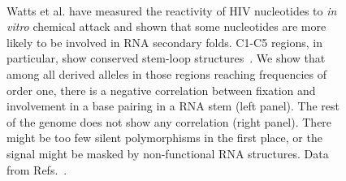 \documentclass[rmp, twocolumn]{revtex4}
\begin{document}
\begin{figure}
\begin{center}
\\
\caption{Watts et al. have measured the reactivity of HIV nucleotides to {\it
in vitro} chemical attack and shown that some nucleotides are more likely to
be involved in RNA secondary folds. C1-C5 regions, in particular, show
conserved stem-loop structures~\citep{watts_architecture_2009}. We show that
among all derived alleles in those regions reaching frequencies of order one,
there is a negative correlation between fixation and involvement in a base
pairing in a RNA stem (left panel). The rest of the genome does not show any
correlation (right panel). There might be too few silent polymorphisms in the
first place, or the signal might be masked by non-functional RNA
structures. Data from Refs.~\cite{shankarappa_consistent_1999,
bunnik_autologous_2008, liu_selection_2006}.}
\label{fig:SHAPE}
\end{center}
\end{figure}
\end{document}
